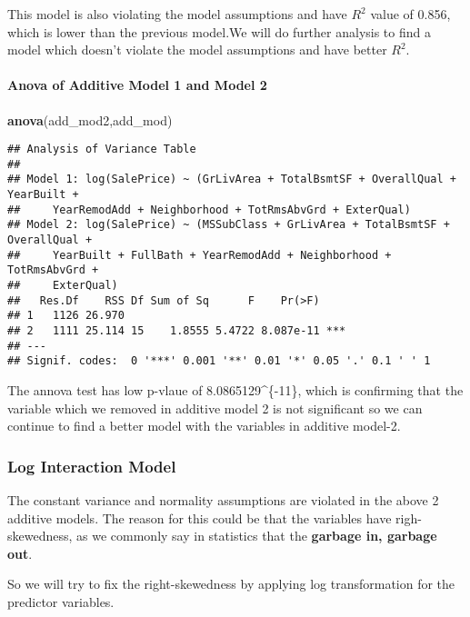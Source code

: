 \documentclass[]{article}
\newenvironment{Shaded}{\begin{snugshade}}{\end{snugshade}}
\newcommand{\KeywordTok}[1]{\textcolor[rgb]{0.13,0.29,0.53}{\textbf{#1}}}
\newcommand{\NormalTok}[1]{#1}
\let\oldparagraph\paragraph
\renewcommand{\paragraph}[1]{\oldparagraph{#1}\mbox{}}
\begin{document}
This model is also violating the model assumptions and have \(R^2\)
value of 0.856, which is lower than the previous model.We will do
further analysis to find a model which doesn't violate the model
assumptions and have better \(R^2\).

\paragraph{Anova of Additive Model 1 and Model
2}\label{anova-of-additive-model-1-and-model-2}

\begin{Shaded}
\begin{Highlighting}[]
\KeywordTok{anova}\NormalTok{(add_mod2,add_mod)}
\end{Highlighting}
\end{Shaded}

\begin{verbatim}
## Analysis of Variance Table
## 
## Model 1: log(SalePrice) ~ (GrLivArea + TotalBsmtSF + OverallQual + YearBuilt + 
##     YearRemodAdd + Neighborhood + TotRmsAbvGrd + ExterQual)
## Model 2: log(SalePrice) ~ (MSSubClass + GrLivArea + TotalBsmtSF + OverallQual + 
##     YearBuilt + FullBath + YearRemodAdd + Neighborhood + TotRmsAbvGrd + 
##     ExterQual)
##   Res.Df    RSS Df Sum of Sq      F    Pr(>F)    
## 1   1126 26.970                                  
## 2   1111 25.114 15    1.8555 5.4722 8.087e-11 ***
## ---
## Signif. codes:  0 '***' 0.001 '**' 0.01 '*' 0.05 '.' 0.1 ' ' 1
\end{verbatim}

The annova test has low p-vlaue of 8.0865129\^{}\{-11\}, which
is confirming that the variable which we removed in additive model 2 is
not significant so we can continue to find a better model with the
variables in additive model-2.

\subsubsection{Log Interaction Model}\label{log-interaction-model}

The constant variance and normality assumptions are violated in the
above 2 additive models. The reason for this could be that the variables
have righ-skewedness, as we commonly say in statistics that the
\textbf{garbage in, garbage out}.

So we will try to fix the right-skewedness by applying log
transformation for the predictor variables.
\end{document}
